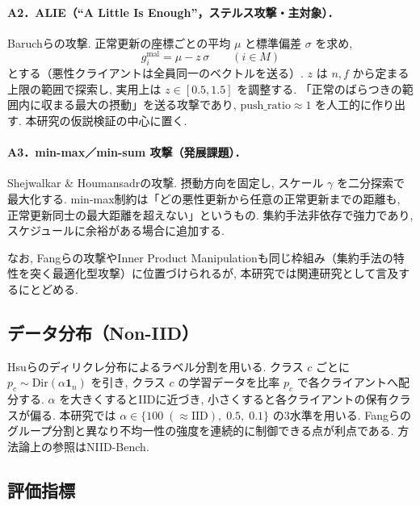 \documentclass[a4j, twocolumn, dvipdfmx]{jsarticle}
\begin{document}
\paragraph{A2．ALIE（``A Little Is Enough''，ステルス攻撃・主対象）．}
Baruchら\cite{baruch2019little}の攻撃. 正常更新の座標ごとの平均 $\mu$ と標準偏差 $\sigma$ を求め,
\begin{equation}
g_i^{\text{mal}} = \mu - z\,\sigma \qquad (i \in M)
\end{equation}
とする（悪性クライアントは全員同一のベクトルを送る）. $z$ は $n, f$ から定まる上限の範囲で探索し, 実用上は $z \in [0.5, 1.5]$ を調整する. 「正常のばらつきの範囲内に収まる最大の摂動」を送る攻撃であり, $\mathrm{push\_ratio} \approx 1$ を人工的に作り出す. 本研究の仮説検証の中心に置く.

\paragraph{A3．min-max／min-sum 攻撃（発展課題）．}
Shejwalkar \& Houmansadr\cite{shejwalkar2021manipulating}の攻撃. 摂動方向を固定し, スケール $\gamma$ を二分探索で最大化する. min-max制約は「どの悪性更新から任意の正常更新までの距離も, 正常更新同士の最大距離を超えない」というもの. 集約手法非依存で強力であり, スケジュールに余裕がある場合に追加する.

なお, Fangら\cite{fang2020local}の攻撃やInner Product Manipulation\cite{xie2019fall}も同じ枠組み（集約手法の特性を突く最適化型攻撃）に位置づけられるが, 本研究では関連研究として言及するにとどめる.

\subsection{データ分布（Non-IID）}

Hsuら\cite{hsu2019measuring}のディリクレ分布によるラベル分割を用いる. クラス $c$ ごとに $p_c \sim \mathrm{Dir}(\alpha \mathbf{1}_n)$ を引き, クラス $c$ の学習データを比率 $p_c$ で各クライアントへ配分する. $\alpha$ を大きくするとIIDに近づき, 小さくすると各クライアントの保有クラスが偏る. 本研究では $\alpha \in \{100\;(\approx\text{IID}),\; 0.5,\; 0.1\}$ の3水準を用いる. Fangらのグループ分割と異なり不均一性の強度を連続的に制御できる点が利点である. 方法論上の参照はNIID-Bench\cite{li2022federated}.

\subsection{評価指標}
\label{sec:metrics}
\end{document}
